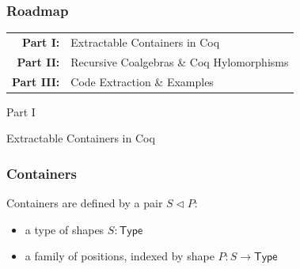 \begin{frame}
  \frametitle{Roadmap}
  \centering
  \LARGE

    \begin{sticky}%
      \vspace{-1.5em}
      \begin{tabular}{@{}rl}
        {\textbf{\color{gray}Part I:}} & Extractable Containers in Coq \\
        {\textbf{\color{gray}Part II:}} & Recursive Coalgebras \& Coq Hylomorphisms \\
        {\textbf{\color{gray}Part III:}} & Code Extraction \& Examples 
      \end{tabular}
    \end{sticky}
\end{frame}
% 
% 
% 
\begin{frame}
  \vfill
  \centering
  \begin{sticky}
    {\normalfont Part I}

    {\normalfont\Large Extractable Containers in Coq}
    \par%
  \end{sticky}
  \vfill
\end{frame}

\begin{frame}
  \frametitle{Containers}

  Containers are defined by a  pair $S \triangleleft P$:
  \begin{itemize}
    \item a type of \alert{shapes} $S : \mathsf{Type}$
    \item a \alert{family} of positions, indexed by shape $P : S \to \mathsf{Type}$
  \end{itemize}

  \vspace{.7cm}
\end{frame}

